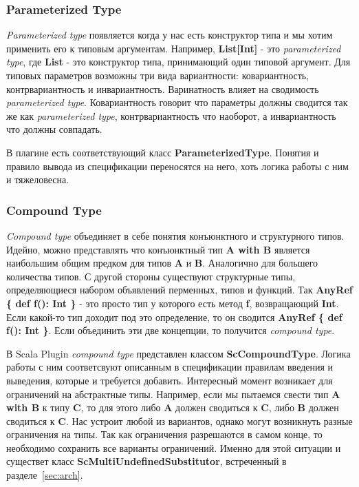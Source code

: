 \subsubsection{Parameterized Type}
\textit{Parameterized type} появляется когда у нас есть конструктор типа и мы хотим
применить его к типовым аргументам.
Например, \textbf{List[Int]} - это \textit{parameterized type},
где \textbf{List} - это конструктор типа, принимающий один типовой
аргумент.
Для типовых параметров возможны три вида вариантности:
ковариантность, контрвариантность и инвариантность.
Варинатность влияет на сводимость \textit{parameterized type}.
Ковариантность говорит что параметры должны сводится так же как
\textit{parameterized type}, контрвариантность что наоборот, а инвариантность
что должны совпадать.

В плагине есть соответствующий класс \textbf{ParameterizedType}.
Понятия и правило вывода из спецификации переносятся на него, хоть логика
работы с ним и тяжеловесна.

\subsubsection{Compound Type}
\textit{Compound type} объединяет в себе понятия конъюнктного и структурного
типов.
Идейно, можно представлять что конъюнктный тип \textbf{A with B} является
наибольшим общим предком для типов \textbf{A} и \textbf{B}.
Аналогично для большего количества типов.
С другой стороны существуют структурные типы, определяющиеся набором объявлений
перменных, типов и функций.
Так \textbf{AnyRef \{ def f(): Int \}} - это просто тип у которого есть
метод \textbf{f}, возвращающий \textbf{Int}.
Если какой-то тип доходит под это определение, то он сводится
\textbf{AnyRef \{ def f(): Int \}}.
Если объединить эти две концепции, то получится \textit{compound type}.

В Scala Plugin \textit{compound type} представлен классом \textbf{ScCompoundType}.
Логика работы с ним соответсвуют описанным в спецификации правилам введения и
выведения, которые и требуется добавить.
Интересный момент возникает для ограничений на абстрактные типы.
Например, если мы пытаемся свести тип \textbf{A with B} к типу \textbf{C},
то для этого либо \textbf{A} должен сводиться к \textbf{C}, либо \textbf{B}
должен сводиться к \textbf{C}.
Нас устроит любой из вариантов, однако могут возникнуть разные ограничения на
типы.
Так как ограничения разрешаются в самом конце, то необходимо сохранить все
варианты ограничений.
Именно для этой ситуации и существет класс \textbf{ScMultiUndefinedSubstitutor},
встреченный в разделе~\ref{sec:arch}.

